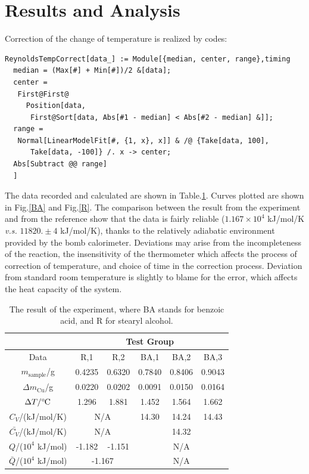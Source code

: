 \documentclass[%
 reprint,
 amsmath,amssymb,
 aps,
10.5pt,
]{revtex4-1}
\newcommand{\celsius}{\ensuremath{^\circ\hspace{-0.09em}\mathrm{C}}}
\begin{document}
\section{Results and Analysis}
Correction of the change of temperature is realized by codes:
\begin{lstlisting}
ReynoldsTempCorrect[data_] := Module[{median, center, range},timing
  median = (Max[#] + Min[#])/2 &[data];
  center = 
   First@First@
     Position[data, 
      First@Sort[data, Abs[#1 - median] < Abs[#2 - median] &]];
  range = 
   Normal[LinearModelFit[#, {1, x}, x]] & /@ {Take[data, 100], 
      Take[data, -100]} /. x -> center;
  Abs[Subtract @@ range]
  ]
\end{lstlisting}

The data recorded and calculated are shown in Table.\ref{result}. Curves plotted are shown in Fig.\ref{BA} and Fig.\ref{R}. The comparison between the result from the experiment and from the reference show that the data is fairly reliable ($1.167 \times 10^4$ kJ/mol/K \emph{v.s.} $11820. \pm 4$ kJ/mol/K\cite{freedman1989heats}), thanks to the relatively adiabatic environment provided by the bomb calorimeter. Deviations may arise from the incompleteness of the reaction, the insensitivity of the thermometer which affects the process of correction of temperature, and choice of time in the correction process. Deviation from standard room temperature is slightly to blame for the error, which affects the heat capacity of the system.

\begin{table}
\centering
\caption{The result of the experiment, where BA stands for benzoic acid, and R for stearyl alcohol.}
\begin{tabular}{c|cc|ccc}\hline
 & \multicolumn{5}{c}{Test Group} \\\hline
Data &  R,1 & R,2 & BA,1 & BA,2 & BA,3 \\\hline
$m_\text{sample}$/g & 0.4235 & 0.6320 & 0.7840 & 0.8406 & 0.9043 \\
$\Delta m_\text{Cu}$/g & 0.0220 & 0.0202 & 0.0091 & 0.0150 & 0.0164  \\
$\Delta T/\celsius$ & 1.296 & 1.881 & 1.452 & 1.564 & 1.662 \\
$C_V$/(kJ/mol/K) & \multicolumn{2}{c|}{N/A} & 14.30 & 14.24 & 14.43 \\
$\bar{C_V}$/(kJ/mol/K) & \multicolumn{2}{c|}{N/A} & \multicolumn{3}{c}{14.32} \\
$Q$/($10^4$ kJ/mol) & -1.182 & -1.151 & \multicolumn{3}{c}{N/A} \\
$\bar{Q}$/($10^4$ kJ/mol) & \multicolumn{2}{c|}{-1.167} & \multicolumn{3}{c}{N/A}\\\hline
\end{tabular}
\label{result}
\end{table}
\end{document}
